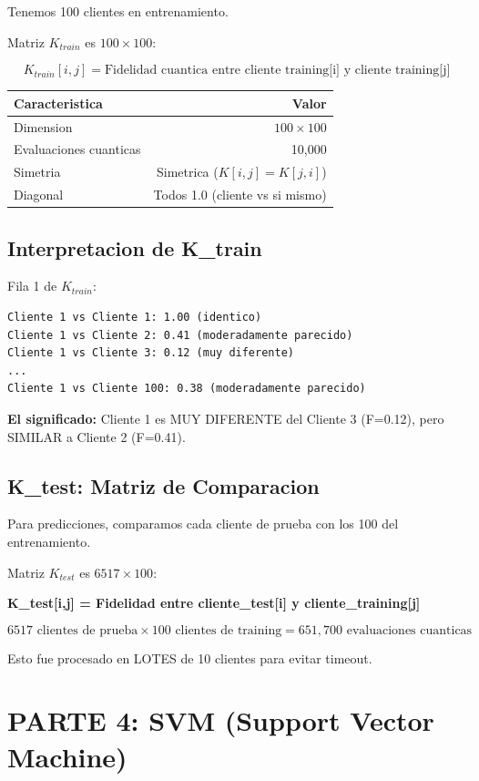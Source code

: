 \documentclass[11pt]{article}
\begin{document}
Tenemos 100 clientes en entrenamiento.

Matriz $K_{train}$ es $100 \times 100$:

$$K_{train}[i,j] = \text{Fidelidad cuantica entre cliente training[i] y cliente training[j]}$$

\begin{tabular}{|l|r|}
\hline
\textbf{Caracteristica} & \textbf{Valor} \\
\hline
Dimension & $100 \times 100$ \\
Evaluaciones cuanticas & 10,000 \\
Simetria & Simetrica ($K[i,j] = K[j,i]$) \\
Diagonal & Todos 1.0 (cliente vs si mismo) \\
\hline
\end{tabular}

\subsection*{Interpretacion de K\_train}

Fila 1 de $K_{train}$:

\begin{verbatim}
Cliente 1 vs Cliente 1: 1.00 (identico)
Cliente 1 vs Cliente 2: 0.41 (moderadamente parecido)
Cliente 1 vs Cliente 3: 0.12 (muy diferente)
...
Cliente 1 vs Cliente 100: 0.38 (moderadamente parecido)
\end{verbatim}

\textbf{El significado:} Cliente 1 es MUY DIFERENTE del Cliente 3 (F=0.12), pero SIMILAR a Cliente 2 (F=0.41).

\subsection*{K\_test: Matriz de Comparacion}

Para predicciones, comparamos cada cliente de prueba con los 100 del entrenamiento.

Matriz $K_{test}$ es $6517 \times 100$:

\textbf{K\_test[i,j] = Fidelidad entre cliente\_test[i] y cliente\_training[j]}

$$6517 \text{ clientes de prueba} \times 100 \text{ clientes de training} = 651,700 \text{ evaluaciones cuanticas}$$

Esto fue procesado en LOTES de 10 clientes para evitar timeout.

\section*{PARTE 4: SVM (Support Vector Machine)}
\end{document}
